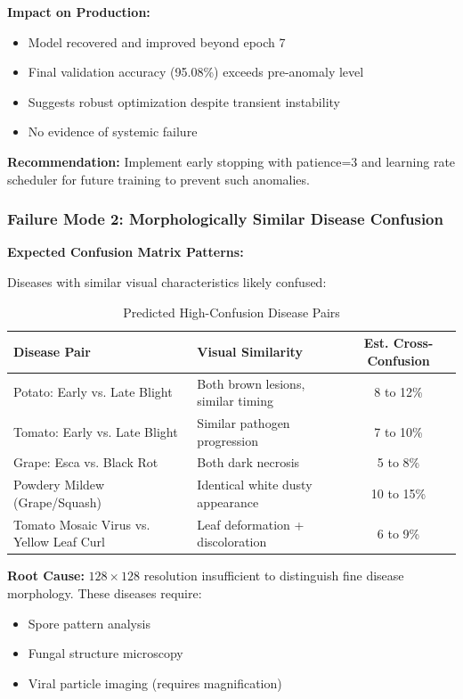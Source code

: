 \documentclass[11pt,a4paper]{article}
\begin{document}
\textbf{Impact on Production:}
\begin{itemize}
    \item Model recovered and improved beyond epoch 7
    \item Final validation accuracy (95.08\%) exceeds pre-anomaly level
    \item Suggests robust optimization despite transient instability
    \item No evidence of systemic failure
\end{itemize}

\textbf{Recommendation:} Implement early stopping with patience=3 and learning rate scheduler for future training to prevent such anomalies.

\subsubsection{Failure Mode 2: Morphologically Similar Disease Confusion}

\textbf{Expected Confusion Matrix Patterns:}

Diseases with similar visual characteristics likely confused:

\begin{table}[H]
\centering
\caption{Predicted High-Confusion Disease Pairs}
\label{tab:confusion}
\begin{tabularx}{\textwidth}{>{\raggedright\arraybackslash}X >{\raggedright\arraybackslash}X c}
\toprule
\rowcolor{primarynavy}
\color{white}\textbf{Disease Pair} & \color{white}\textbf{Visual Similarity} & \color{white}\textbf{Est. Cross-Confusion} \\
\midrule
Potato: Early vs. Late Blight & Both brown lesions, similar timing & 8 to 12\% \\
\rowcolor{iceblue}
Tomato: Early vs. Late Blight & Similar pathogen progression & 7 to 10\% \\
Grape: Esca vs. Black Rot & Both dark necrosis & 5 to 8\% \\
\rowcolor{iceblue}
Powdery Mildew (Grape/Squash) & Identical white dusty appearance & 10 to 15\% \\
Tomato Mosaic Virus vs. Yellow Leaf Curl & Leaf deformation + discoloration & 6 to 9\% \\
\bottomrule
\end{tabularx}
\end{table}

\textbf{Root Cause:} $128 \times 128$ resolution insufficient to distinguish fine disease morphology. These diseases require:
\begin{itemize}
  \item Spore pattern analysis
  \item Fungal structure microscopy
  \item Viral particle imaging (requires magnification)
\end{itemize}
\end{document}
